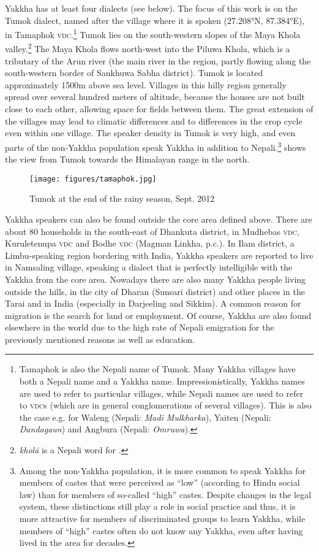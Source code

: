 Yakkha has at least four dialects (see  below). The focus of this work is on the Tumok dialect, named after the village where it is spoken (27.208°N, 87.384°E), in Tamaphok \textsc{vdc}.\footnote{Tamaphok is also the Nepali name of Tumok. Many Yakkha villages have both a Nepali name and a Yakkha name. Impressionistically, Yakkha names are used to refer to particular villages, while  Nepali names are used to refer  to \textsc{vdc}s (which are in general conglomerations of several villages). This is also the case e.g. for Waleng (Nepali: \emph{Madi Mulkharka}), Yaiten (Nepali: \emph{Dandagaun}) and Angbura (Nepali: \emph{Omruwa}).} Tumok  lies on the south-western slopes of the Maya Khola valley.\footnote{\emph{kholā} is a Nepali word for .} The Maya Khola flows north-west into the Piluwa Khola, which is a tributary of the Arun river (the main river in the region, partly flowing along the south-western border of Sankhuwa Sabha district). Tumok  is located approximately 1500m above sea level. Villages in this hilly region generally spread over several hundred meters of altitude, because the houses are not built close to each other, allowing space for fields between them. The great extension of the villages may lead to climatic differences and to differences in the crop cycle even within one village. The speaker density in Tumok is very high, and even parts of the non-Yakkha population speak Yakkha in addition to Nepali.\footnote{Among the non-Yakkha population, it is more common to speak Yakkha for members of castes that were perceived as “low” (according to Hindu social law)  than for members of so-called “high” castes. Despite changes in the legal system, these distinctions still play a role in social practice and thus, it is more attractive for members of discriminated groups to learn Yakkha, while members of “high” castes often do not know any Yakkha, even after having lived in the area for decades.}  shows the view from Tumok towards the Himalayan range in the north. 

\begin{figure}
\centering
\texttt{[image: figures/tamaphok.jpg]}
\caption{Tumok at the end of the rainy season, Sept. 2012}\label{tumok}
\end{figure}
 

Yakkha speakers can also be found outside the core area defined above. There are about 80 households in the south-east of Dhankuta district, in Mudhebas \textsc{vdc}, Kuruletenupa \textsc{vdc} and Bodhe \textsc{vdc} (Magman Linkha, p.c.). In Ilam district, a Limbu-speaking region bordering with India, Yakkha speakers are reported to live in Namsaling village, speaking a dialect that is perfectly intelligible with the Yakkha from the core area. Nowadays there are also many Yakkha people living outside the hills, in the city of Dharan (Sunsari district) and other places in the Tarai and in India (especially in Darjeeling and Sikkim). A common reason for migration is the search for land or employment. Of course, Yakkha are also found elsewhere in the world due to the high rate of Nepali emigration for the previously mentioned reasons as well as education. 


